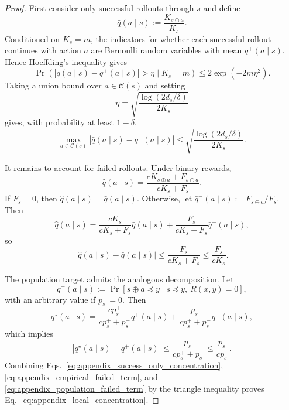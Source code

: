 \documentclass{article}
\begin{document}
\begin{proof}
First consider only successful rollouts through $s$ and define
\begin{equation}
\bar q(a\mid s)
:=
\frac{K_{s\oplus a}}{K_s}.
\end{equation}
Conditioned on $K_s=m$, the indicators for whether each successful rollout
continues with action $a$ are Bernoulli random variables with mean
$q^+(a\mid s)$. Hence Hoeffding's inequality gives
\begin{equation}
\Pr\!\left(
|\bar q(a\mid s)-q^+(a\mid s)|>\eta
\mid K_s=m
\right)
\le
2\exp(-2m\eta^2).
\end{equation}
Taking a union bound over $a\in\mathcal{C}(s)$ and setting
\[
\eta=
\sqrt{\frac{\log(2d_s/\delta)}{2K_s}}
\]
gives, with probability at least $1-\delta$,
\begin{equation}
\max_{a\in\mathcal{C}(s)}
|\bar q(a\mid s)-q^+(a\mid s)|
\le
\sqrt{\frac{\log(2d_s/\delta)}{2K_s}}.
\label{eq:appendix_success_only_concentration}
\end{equation}

It remains to account for failed rollouts. Under binary rewards,
\begin{equation}
\widehat q(a\mid s)
=
\frac{cK_{s\oplus a}+F_{s\oplus a}}{cK_s+F_s}.
\end{equation}
If $F_s=0$, then $\widehat q(a\mid s)=\bar q(a\mid s)$. Otherwise, let
$\bar q^-(a\mid s):=F_{s\oplus a}/F_s$. Then
\begin{equation}
\widehat q(a\mid s)
=
\frac{cK_s}{cK_s+F_s}\bar q(a\mid s)
+
\frac{F_s}{cK_s+F_s}\bar q^-(a\mid s),
\end{equation}
so
\begin{equation}
|\widehat q(a\mid s)-\bar q(a\mid s)|
\le
\frac{F_s}{cK_s+F_s}
\le
\frac{F_s}{cK_s}.
\label{eq:appendix_empirical_failed_term}
\end{equation}

The population target admits the analogous decomposition. Let
\[
q^-(a\mid s)
:=
\Pr[s\oplus a\preceq y \mid s\preceq y,\ R(x,y)=0],
\]
with an arbitrary value if $p_s^-=0$. Then
\begin{equation}
q^\star(a\mid s)
=
\frac{cp_s^+}{cp_s^+ + p_s^-}q^+(a\mid s)
+
\frac{p_s^-}{cp_s^+ + p_s^-}q^-(a\mid s),
\end{equation}
which implies
\begin{equation}
|q^\star(a\mid s)-q^+(a\mid s)|
\le
\frac{p_s^-}{cp_s^+ + p_s^-}
\le
\frac{p_s^-}{cp_s^+}.
\label{eq:appendix_population_failed_term}
\end{equation}
Combining Eqs.~\eqref{eq:appendix_success_only_concentration},
\eqref{eq:appendix_empirical_failed_term}, and
\eqref{eq:appendix_population_failed_term} by the triangle inequality proves
Eq.~\eqref{eq:appendix_local_concentration}.
\end{proof}
\end{document}
